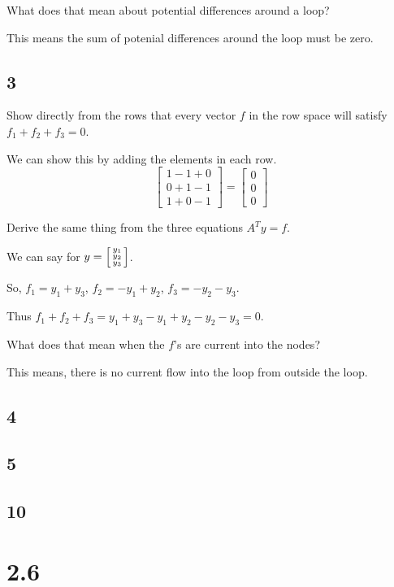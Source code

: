 \documentclass[12pt,letterpaper]{article}
\begin{document}
      What does that mean about potential differences around a loop?

      This means the sum of potenial differences around the loop must be zero.

    \subsection*{3}
      Show directly from the rows that every vector $f$ in the row space will satisfy $f_1 + f_2 + f_3 = 0$.

      We can show this by adding the elements in each row.
      \[
        \begin{bmatrix}
          1 - 1 + 0 \\
          0 + 1 - 1 \\
          1 + 0 - 1
        \end{bmatrix}
        =
        \begin{bmatrix}
          0 \\
          0 \\
          0
        \end{bmatrix}
      \]

      Derive the same thing from the three equations $A^Ty = f$.

      We can say for $y = \begin{bsmallmatrix}y_1 \\ y_2 \\ y_3\end{bsmallmatrix}$.

      So, $f_1 = y_1 + y_3$, $f_2 = -y_1 + y_2$, $f_3 = -y_2 - y_3$.

      Thus $f_1 + f_2 + f_3 = y_1 + y_3 - y_1 + y_2 - y_2 - y_3 = 0$.

      What does that mean when the $f$'s are current into the nodes?

      This means, there is no current flow into the loop from outside the loop.
    \subsection*{4}
    \subsection*{5}
    \subsection*{10}

  \section*{2.6}
\end{document}
